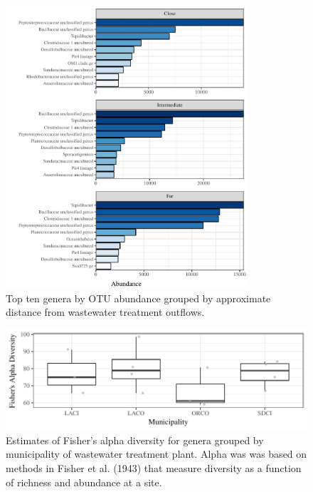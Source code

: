 \documentclass[letterpaper,12pt]{article}\usepackage[]{graphicx}\usepackage[]{color}
\makeatletter
\def\maxwidth{ %
  \ifdim\Gin@nat@width>\linewidth
    \linewidth
  \else
    \Gin@nat@width
  \fi
}
\newenvironment{knitrout}{}{} %
\makeatother
\begin{document}
\begin{knitrout}
\color{fgcolor}\begin{figure}[!ht]

{\centering \includegraphics[width=0.8\textwidth]{figs/abundcont} 

}

\caption[Top ten genera by OTU abundance grouped by approximate distance from wastewater treatment outflows]{Top ten genera by OTU abundance grouped by approximate distance from wastewater treatment outflows.}\label{fig:abundcont}
\end{figure}


\end{knitrout}
\clearpage

\clearpage
\begin{knitrout}
\color{fgcolor}\begin{figure}[!ht]

{\centering \includegraphics[width=\maxwidth]{figs/boxdivwwtp} 

}

\caption[Estimates of Fisher's alpha diversity for genera grouped by municipality of wastewater treatment plant]{Estimates of Fisher's alpha diversity for genera grouped by municipality of wastewater treatment plant. Alpha was was based on methods in Fisher et al. (1943) that measure diversity as a function of richness and abundance at a site.}\label{fig:boxdivwwtp}
\end{figure}


\end{knitrout}
\end{document}
